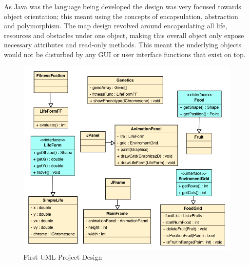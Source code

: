 \documentclass[12pt]{article}
\begin{document}
As Java was the language being developed the design was very focused towards object orientation; this meant using the concepts 
of encapsulation, abstraction and polymorphism. The map design revolved around encapsulating all life, resources and obstacles 
under one object, making this overall object only expose necessary attributes and read-only methods. This meant the underlying 
objects would not be disturbed by any GUI or user interface functions that exist on top.  

\begin{figure} [ht]
\centering
\includegraphics[scale = 0.5]{uml1.png}
\caption{First UML Project Design}
\label{fig:umldiag1}
\end{figure}
\end{document}
